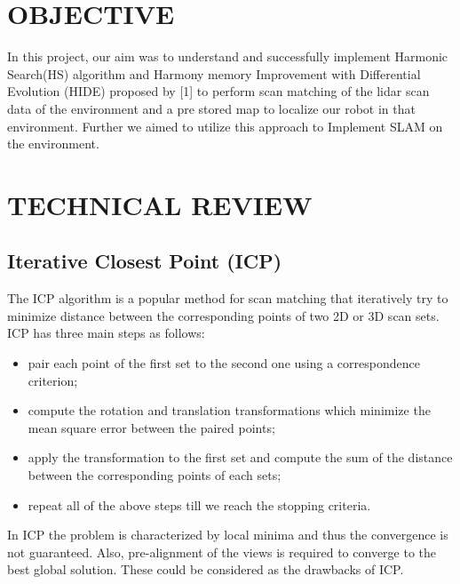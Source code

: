 \documentclass[letterpaper, 10 pt, conference]{ieeeconf}  %
\begin{document}
\section{OBJECTIVE}
In this project, our aim was to understand and successfully implement Harmonic Search(HS)  algorithm and Harmony memory Improvement with Differential Evolution (HIDE) proposed by [1] to perform scan matching of the lidar scan data of the environment and a pre stored map to localize our robot in that environment. Further we aimed to  utilize this approach to Implement SLAM on the environment.

\section{TECHNICAL REVIEW}



\subsection{Iterative Closest Point (ICP)}

The ICP algorithm is a popular method for scan matching that iteratively try to minimize distance between the corresponding points of two 2D or 3D scan sets. ICP has three main steps as follows:
\begin{itemize}
 \item pair each point of the first set to the second one using a correspondence criterion; 
\item compute the rotation and translation transformations which minimize the mean square error between the paired points; 
\item apply the transformation to the first set and compute the sum of the distance between the corresponding points of each sets;
\item repeat all of the above steps till we reach the stopping criteria.
\end{itemize}

In ICP the problem is characterized by local minima and thus the convergence is not guaranteed. Also,  pre-alignment of the views is required to converge to the best global solution. These could be considered as the drawbacks of ICP.
\end{document}
